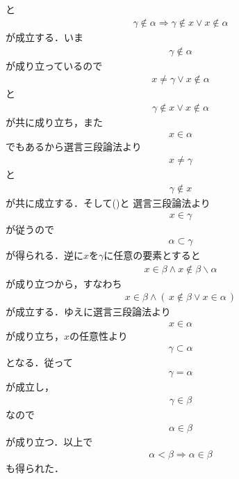 \begin{prf}
\begin{align}
		\end{align}
		と
		\begin{align}
			\gamma \notin \alpha \Longrightarrow \gamma \notin x \vee x \notin \alpha
		\end{align}
		が成立する．いま
		\begin{align}
			\gamma \notin \alpha
		\end{align}
		が成り立っているので
		\begin{align}
			x \neq \gamma \vee x \notin \alpha
		\end{align}
		と
		\begin{align}
			\gamma \notin x \vee x \notin \alpha
		\end{align}
		が共に成り立ち，また
		\begin{align}
			x \in \alpha
		\end{align}
		でもあるから選言三段論法より
		\begin{align}
			x \neq \gamma
		\end{align}
		と
		\begin{align}
			\gamma \notin x
		\end{align}
		が共に成立する．そして()と
		選言三段論法より
		\begin{align}
			x \in \gamma
		\end{align}
		が従うので
		\begin{align}
			\alpha \subset \gamma
		\end{align}
		が得られる．逆に$x$を$\gamma$に任意の要素とすると
		\begin{align}
			x \in \beta \wedge x \notin \beta \backslash \alpha
		\end{align}
		が成り立つから，すなわち
		\begin{align}
			x \in \beta \wedge (\, x \notin \beta \vee x \in \alpha\, )
		\end{align}
		が成立する．ゆえに選言三段論法より
		\begin{align}
			x \in \alpha
		\end{align}
		が成り立ち，$x$の任意性より
		\begin{align}
			\gamma \subset \alpha
		\end{align}
		となる．従って
		\begin{align}
			\gamma = \alpha
		\end{align}
		が成立し，
		\begin{align}
			\gamma \in \beta
		\end{align}
		なので
		\begin{align}
			\alpha \in \beta
		\end{align}
		が成り立つ．以上で
		\begin{align}
			\alpha < \beta \Longrightarrow \alpha \in \beta
		\end{align}
		も得られた．
		\QED
	\end{prf}
	
